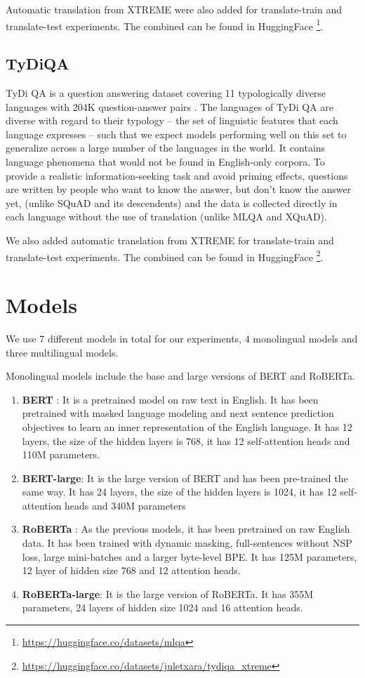 \documentclass[11pt]{article}
\begin{document}
Automatic translation from XTREME \cite{XTREME} were also added for translate-train and translate-test experiments. The combined can be found in HuggingFace \footnote{\url{https://huggingface.co/datasets/mlqa}}.

\subsection{TyDiQA}

TyDi QA is a question answering dataset covering 11 typologically diverse languages with 204K question-answer pairs \cite{tydiqa}. The languages of TyDi QA are diverse with regard to their typology -- the set of linguistic features that each language expresses -- such that we expect models performing well on this set to generalize across a large number of the languages in the world. It contains language phenomena that would not be found in English-only corpora. To provide a realistic information-seeking task and avoid priming effects, questions are written by people who want to know the answer, but don’t know the answer yet, (unlike SQuAD and its descendents) and the data is collected directly in each language without the use of translation (unlike MLQA and XQuAD).

We also added automatic translation from XTREME \cite{XTREME} for translate-train and translate-test experiments. The combined can be found in HuggingFace \footnote{\url{https://huggingface.co/datasets/juletxara/tydiqa_xtreme}}.

\section{Models}

We use 7 different models in total for our experiments, 4 monolingual models and three multilingual models.

Monolingual models include the base and large versions of BERT and RoBERTa.

\begin{enumerate}
    \item \textbf{BERT} \cite{BERT}: It is a pretrained model on raw text in English. It has been pretrained with masked language modeling and next sentence prediction objectives to learn an inner representation of the English language. It has 12 layers, the size of the hidden layers is 768, it has 12 self-attention heads and 110M parameters.
    \item \textbf{BERT-large}: It is the large version of BERT and has been pre-trained the same way. It has 24 layers, the size of the hidden layers is 1024, it has 12 self-attention heads and 340M parameters
    \item \textbf{RoBERTa} \cite{ROBERTA}: As the previous models, it has been pretrained on raw English data. It has been trained with dynamic masking, full-sentences without NSP loss, large mini-batches and a larger byte-level BPE. It has 125M parameters, 12 layer of hidden size 768 and 12 attention heads.
    \item \textbf{RoBERTa-large}: It is the large version of RoBERTa. It has 355M parameters, 24 layers of hidden size 1024 and 16 attention heads.
\end{enumerate}
\end{document}
